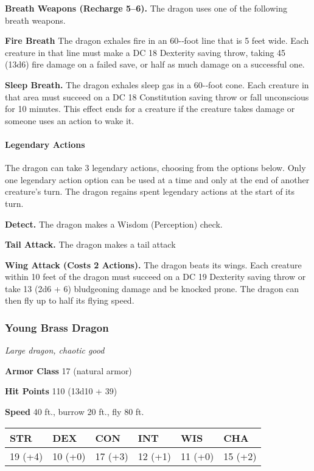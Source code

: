 \documentclass[
]{article}
\begin{document}
\textbf{Breath Weapons (Recharge 5--6).} The dragon uses one of the
following breath weapons.

\textbf{Fire Breath} The dragon exhales fire in an 60-­‐foot line that
is 5 feet wide. Each creature in that line must make a DC 18 Dexterity
saving throw, taking 45 (13d6) fire damage on a failed save, or half as
much damage on a successful one.

\textbf{Sleep Breath.} The dragon exhales sleep gas in a 60-­‐foot cone.
Each creature in that area must succeed on a DC 18 Constitution saving
throw or fall unconscious for 10 minutes. This effect ends for a
creature if the creature takes damage or someone uses an action to wake
it.

\hypertarget{legendary-actions-11}{%
\paragraph{Legendary Actions}\label{legendary-actions-11}}

The dragon can take 3 legendary actions, choosing from the options
below. Only one legendary action option can be used at a time and only
at the end of another creature's turn. The dragon regains spent
legendary actions at the start of its turn.

\textbf{Detect.} The dragon makes a Wisdom (Perception) check.

\textbf{Tail Attack.} The dragon makes a tail attack

\textbf{Wing Attack (Costs 2 Actions).} The dragon beats its wings. Each
creature within 10 feet of the dragon must succeed on a DC 19 Dexterity
saving throw or take 13 (2d6 + 6) bludgeoning damage and be knocked
prone. The dragon can then fly up to half its flying speed.

\hypertarget{young-brass-dragon}{%
\subsubsection{Young Brass Dragon}\label{young-brass-dragon}}

\emph{Large dragon, chaotic good}

\textbf{Armor Class} 17 (natural armor)

\textbf{Hit Points} 110 (13d10 + 39)

\textbf{Speed} 40 ft., burrow 20 ft., fly 80 ft.

\begin{longtable}[]{@{}llllll@{}}
\toprule
STR & DEX & CON & INT & WIS & CHA\tabularnewline
\midrule
\endhead
19 (+4) & 10 (+0) & 17 (+3) & 12 (+1) & 11 (+0) & 15 (+2)\tabularnewline
\bottomrule
\end{longtable}
\end{document}
